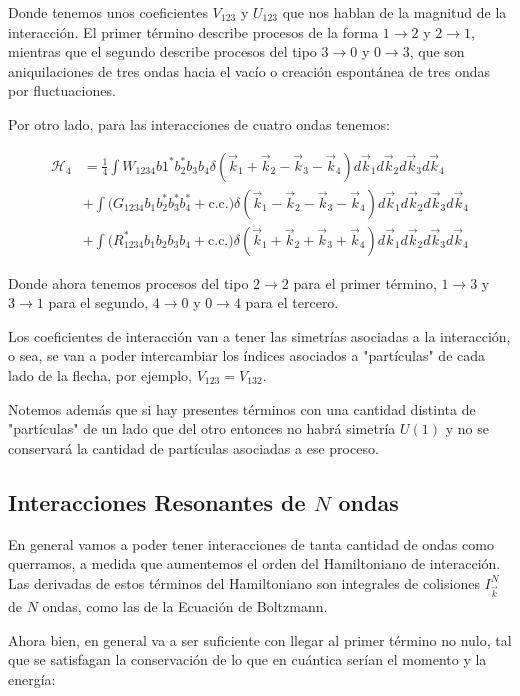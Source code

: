 Donde tenemos unos coeficientes $V_{123}$ y $U_{123}$ que nos hablan de la magnitud de la interacción. El primer término describe procesos de la forma $1\rightarrow2$ y  $2\rightarrow1$, mientras que el segundo describe procesos del tipo $3\rightarrow0$ y $0\rightarrow3$, que son aniquilaciones de tres ondas hacia el vacío o creación espontánea de tres ondas por fluctuaciones. %

Por otro lado, para las interacciones de cuatro ondas tenemos:

\begin{equation}
	\begin{split}
		\mathcal{H}_4 &= \frac{1}{4} \int W_{1234}b1^*b_2^*b_3b_4\delta(\vec k_1+\vec k_2-\vec k_3-\vec k_4) d\vec k_1d\vec k_2d\vec k_3d\vec k_4 \\
		&+\int \big(G_{1234}b_1b_2^*b_3^*b_4^* + \text{c.c.}\big) \delta(\vec k_1-\vec k_2-\vec k_3-\vec k_4) d\vec k_1d\vec k_2d\vec k_3d\vec k_4 \\
		&+\int \big(R^*_{1234}b_1b_2b_3b_4 + \text{c.c.}\big) \delta(\vec k_1+\vec k_2+\vec k_3+\vec k_4) d\vec k_1d\vec k_2d\vec k_3d\vec k_4
	\end{split}	
\end{equation}

Donde ahora tenemos procesos del tipo $2\rightarrow2$ para el primer término, $1\rightarrow3$ y $3\rightarrow1$ para el segundo, $4\rightarrow0$ y $0\rightarrow4$ para el tercero.
 
Los coeficientes de interacción van a tener las simetrías asociadas a la interacción, o sea, se van a poder intercambiar los índices asociados a "partículas" de cada lado de la flecha, por ejemplo, $V_{123}=V_{132}$.

Notemos además que si hay presentes términos con una cantidad distinta de "partículas" de un lado que del otro entonces no habrá simetría $U(1)$ y no se conservará la cantidad de partículas asociadas a ese proceso. 


\subsection*{Interacciones Resonantes de $N$ ondas} %
En general vamos a poder tener interacciones de tanta cantidad de ondas como querramos, a medida que aumentemos el orden del Hamiltoniano de interacción. Las derivadas de estos términos del Hamiltoniano son integrales de colisiones $I_{\vec k}^N$ de $N$ ondas, como las de la Ecuación de Boltzmann. 

Ahora bien, en general va a ser suficiente con llegar al primer término no nulo, tal que se satisfagan la conservación de lo que en cuántica serían el momento y la energía: 

